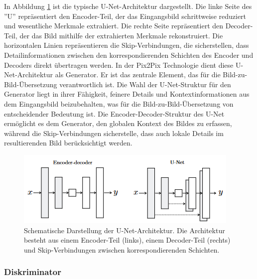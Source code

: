 In Abbildung \ref{fig:unet} ist die typische U-Net-Architektur dargestellt. Die linke Seite des ''U'' repräsentiert den Encoder-Teil, der das Eingangsbild schrittweise reduziert und wesentliche Merkmale extrahiert. Die rechte Seite repräsentiert den Decoder-Teil, der das Bild mithilfe der extrahierten Merkmale rekonstruiert. Die horizontalen Linien repräsentieren die Skip-Verbindungen, die sicherstellen, dass Detailinformationen zwischen den korrespondierenden Schichten des Encoder und Decoders direkt übertragen werden. \newline 
In der Pix2Pix Technologie dient diese U-Net-Architektur als Generator. Er ist das zentrale Element, das für die Bild-zu-Bild-Übersetzung verantwortlich ist. Die Wahl der U-Net-Struktur für den Generator liegt in ihrer Fähigkeit, feinere Details und Kontextinformationen aus dem Eingangsbild beizubehalten, was für die Bild-zu-Bild-Übersetzung von entscheidender Bedeutung ist. Die Encoder-Decoder-Struktur des U-Net ermöglicht es dem Generator, den globalen Kontext des Bildes zu erfassen, während die Skip-Verbindungen sicherstelle, dass auch lokale Details im resultierenden Bild berücksichtigt werden.

\begin{figure}[h]
	\centering
	\includegraphics[width=0.7\linewidth]{./images/unet.png}
	\caption{Schematische Darstellung der U-Net-Architektur. Die Architektur besteht aus einem Encoder-Teil (links), einem Decoder-Teil (rechts) und Skip-Verbindungen zwischen korrespondierenden Schichten.}
	\label{fig:unet}
\end{figure}

\subsubsection{Diskriminator}


